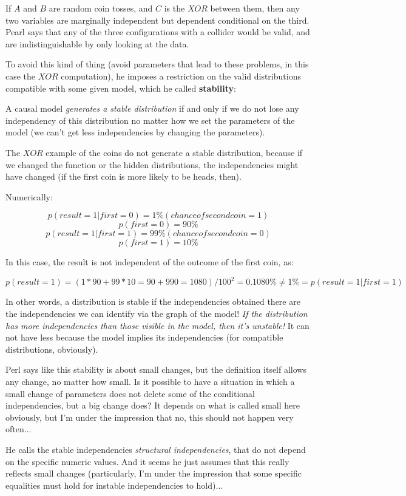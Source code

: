 If $A$ and $B$ are random coin tosses, and $C$ is the $XOR$ between them, then any two variables are marginally independent but dependent conditional on the third. Pearl says that any of the three configurations with a collider would be valid, and are indistinguishable by only looking at the data. 

To avoid this kind of thing (avoid parameters that lead to these problems, in this case the $XOR$ computation), he imposes a restriction on the valid distributions compatible with some given model, which he called \textbf{stability}: 

A causal model \textit{generates a stable distribution} if and only if we do not lose any independency of this distribution no matter how we set the parameters of the model (we can't get less independencies by changing the parameters).

The $XOR$ example of the coins do not generate a stable distribution, because if we changed the function or the hidden distributions, the independencies might have changed (if the first coin is more likely to be heads, then).

Numerically:

$$p(result = 1 | first = 0) = 1\% (chance of second coin = 1)$$
$$p(first = 0) = 90\%$$
$$p(result = 1 | first = 1) = 99\% (chance of second coin = 0)$$
$$p(first = 1) = 10\%$$

In this case, the result is not independent of the outcome of the first coin, as:

$$p(result = 1) = (1*90+99*10=90+990=1080)/100^2 = 0.1080\% \neq 1\% = p(result=1 | first = 1)$$

In other words, a distribution is stable if the independencies obtained there are the independencies we can identify via the graph of the model! \textit{If the distribution has more independencies than those visible in the model, then it's unstable!} It can not have less because the model implies its independencies (for compatible distributions, obviously).

Perl says like this stability is about small changes, but the definition itself allows any change, no matter how small. Is it possible to have a situation in which a small change of parameters does not delete some of the conditional independencies, but a big change does? It depends on what is called small here obviously, but I'm under the impression that no, this should not happen very often...

He calls the stable independencies \textit{structural independencies}, that do not depend on the specific numeric values. And it seems he just assumes that this really reflects small changes (particularly, I'm under the impression that some specific equalities must hold for instable independencies to hold)...



